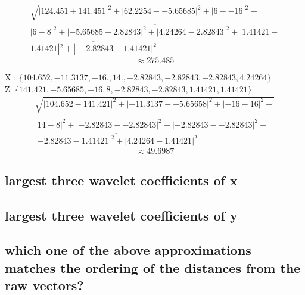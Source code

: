 \documentclass{article}
\begin{document}
\begin{multline*}
	\sqrt{ | 124.451 + 141.451|^2 + | 62.2254 - -5.65685 |^2 + | 6 - -16|^2} + \\ 
	 \overline{| 6 - 8|^2 +  | -5.65685 -2.82843 |^2 + | 4.24264 -2.82843 |^2 + |1.41421 -} \\
	 \overline{1.41421|^2 +| -2.82843 - 1.41421|^2 }  
\end{multline*}
\[ \approx 275.485 \]


X : $\{104.652, -11.3137, -16., 14., -2.82843, -2.82843, -2.82843, 4.24264 \}$ \\
Z: $ \{141.421, -5.65685, -16, 8, -2.82843, -2.82843, 1.41421, 1.41421\} $ \\

\begin{multline*}
	\sqrt{ | 104.652 - 141.421 |^2 + | -11.3137 - -5.65658|^2 + |-16 -16|^2 +} \\
	\overline{|14 -8|^2 + | -2.82843 - -2.82843 |^2 + | -2.82843 - -2.82843 |^2 +} \\
	\overline{ |-2.82843 - 1.41421|^2 + |4.24264 - 1.41421|^2 }
\end{multline*}
\[ \approx 49.6987 \]
\subsection{largest three wavelet coefficients of x}


\subsection{largest three wavelet coefficients of y}


\subsection{which one of the above approximations matches the ordering of the distances from 
the raw vectors?}
\end{document}
